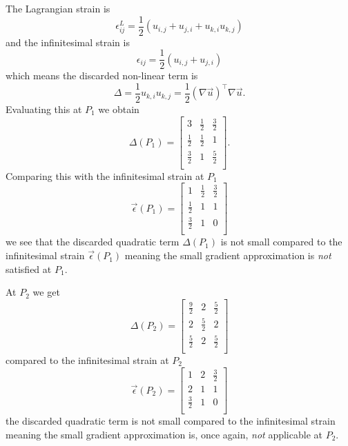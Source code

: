   \begin{derivation}
    The Lagrangian strain is
    \begin{equation*}
      \epsilon_{ij}^{L} = \frac{1}{2} \left( u_{i,j} + u_{j,i} + u_{k,i}u_{k,j} \right)
    \end{equation*}
    and the infinitesimal strain is
    \begin{equation*}
      \epsilon_{ij} = \frac{1}{2} \left( u_{i,j} + u_{j,i} \right)
    \end{equation*}
    which means the discarded non-linear term is
    \begin{equation*}
      \Delta = \frac{1}{2} u_{k,i} u_{k,j} = \frac{1}{2} \left( \nabla \Vec{u} \right)^{\intercal} \nabla \Vec{u}
    .\end{equation*}
    Evaluating this at $P_1$ we obtain
    \begin{equation*}
      \Delta (P_1) = \begin{bmatrix}
        3 & \frac{1}{2} & \frac{3}{2}\\
      \frac{1}{2} & \frac{1}{2} & 1\\
      \frac{3}{2} & 1 & \frac{5}{2}\\
      \end{bmatrix}
    .\end{equation*}
    Comparing this with the infinitesimal strain at $P_1$
    \begin{equation*}
      \Vec{\epsilon}(P_1) = \begin{bmatrix}
        1 & \frac{1}{2} & \frac{3}{2}\\
      \frac{1}{2} & 1 & 1\\
      \frac{3}{2} & 1 & 0\\
      \end{bmatrix}
    \end{equation*}
    we see that the discarded quadratic term $\Delta(P_1)$ is not small compared to the infinitesimal strain $\Vec{\epsilon}(P_1)$ meaning the small gradient approximation is \textit{not} satisfied at $P_1$.

    At $P_2$ we get
    \begin{equation*}
      \Delta (P_2) = \begin{bmatrix}
        \frac{9}{2} & 2 & \frac{5}{2}\\
      2 & \frac{5}{2} & 2\\
      \frac{5}{2} & 2 & \frac{5}{2}\\
      \end{bmatrix}
    \end{equation*}
    compared to the infinitesimal strain at $P_2$
    \begin{equation*}
      \Vec{\epsilon}(P_2) = \begin{bmatrix}
        1 & 2 & \frac{3}{2}\\
      2 & 1 & 1\\
      \frac{3}{2} & 1 & 0\\
      \end{bmatrix}
    \end{equation*}
    the discarded quadratic term is not small compared to the infinitesimal strain meaning the small gradient approximation is, once again, \textit{not} applicable at $P_2$.


\end{derivation}
